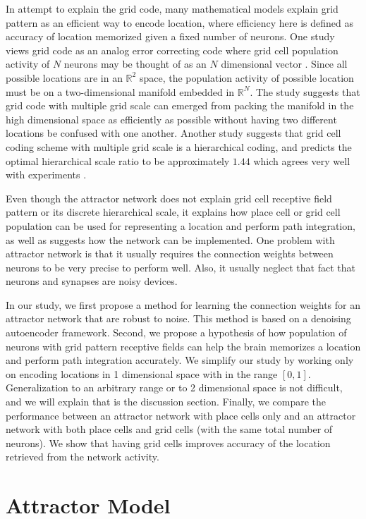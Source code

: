 In attempt to explain the grid code, many mathematical models explain grid pattern as an efficient way to encode location, where efficiency here is defined as accuracy of location memorized given a fixed number of neurons. One study views grid code as an analog error correcting code where grid cell population activity of $N$ neurons may be thought of as an $N$ dimensional vector \cite{ss11}. Since all possible locations are in an $\mathbb{R}^2$ space, the population activity of possible location must be on a two-dimensional manifold embedded in $\mathbb{R}^N$. The study suggests that grid code with multiple grid scale can emerged from packing the manifold in the high dimensional space as efficiently as possible without having two different locations be confused with one another. Another study suggests that grid cell coding scheme with multiple grid scale is a hierarchical coding, and predicts the optimal hierarchical scale ratio to be approximately $1.44$ which agrees very well with experiments \cite{wx13}.

Even though the attractor network does not explain grid cell receptive field pattern or its discrete hierarchical scale, it explains how place cell or grid cell population can be used for representing a location and perform path integration, as well as suggests how the network can be implemented. One problem with attractor network is that it usually requires the connection weights between neurons to be very precise to perform well. Also, it usually neglect that fact that neurons and synapses are noisy devices.

In our study, we first propose a method for learning the connection weights for an attractor network that are robust to noise. This method is based on a denoising autoencoder framework. Second, we propose a hypothesis of how population of neurons with grid pattern receptive fields can help the brain memorizes a location and perform path integration accurately. We simplify our study by working only on encoding locations in 1 dimensional space with in the range $[0, 1]$. Generalization to an arbitrary range or to 2 dimensional space is not difficult, and we will explain that is the discussion section. Finally, we compare the performance between an attractor network with place cells only and an attractor network with both place cells and grid cells (with the same total number of neurons). We show that having grid cells improves accuracy of the location retrieved from the network activity.

\section{Attractor Model}
\label{sec:model}


